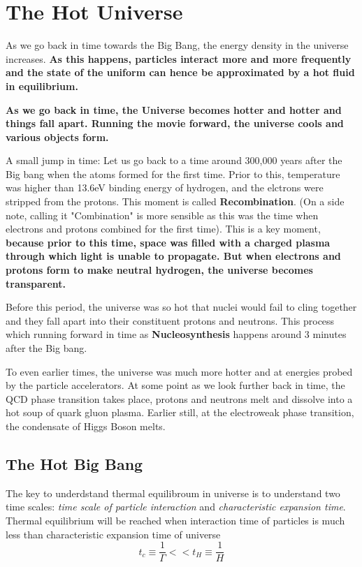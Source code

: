 \documentclass[12pt]{report}
\newcommand{\tbf}[1]{\textbf{#1}}
\newcommand{\tit}[1]{\textit{#1}}
\begin{document}
\chapter{The Hot Universe}
As we go back in time towards the Big Bang, the energy density in the universe increases. \tbf{As this happens, particles interact more and more frequently and the state of the uniform can hence be approximated by a hot fluid in equilibrium.}

\tbf{As we go back in time, the Universe becomes hotter and hotter and things fall apart. Running the movie forward, the universe cools and various objects form.}

A small jump in time: Let us go back to a time around 300,000 years after the Big bang when the atoms formed for the first time. Prior to this, temperature was higher than 13.6eV binding energy of hydrogen, and the elctrons were stripped from the protons. This moment is called \tbf{Recombination}. (On a side note, calling it "Combination" is more sensible as this was the time when electrons and protons combined for the first time). This is a key moment, \tbf{because prior to this time, space was filled with a charged plasma through which light is unable to propagate. But when electrons and protons form to make neutral hydrogen, the universe becomes transparent.}


Before this period, the universe was so hot that nuclei would fail to cling together and they fall apart into their constituent protons and neutrons. This process which running forward in time as \tbf{Nucleosynthesis} happens around 3 minutes after the Big bang.

To even earlier times, the universe was much more hotter and at energies probed by the particle accelerators. At some point as we look further back in time, the QCD phase transition takes place, protons and neutrons melt and dissolve into a hot soup of quark gluon plasma. Earlier still, at the electroweak phase transition, the condensate of Higgs Boson melts. 

\section{The Hot Big Bang}
The key to underdstand thermal equilibroum in universe is to understand two time scales: \tit{time scale of particle interaction} and \tit{characteristic expansion time}. Thermal equilibrium will be reached when interaction time of particles is much less than characteristic expansion time of universe
\begin{equation*}
t_c \equiv \frac{1}{\Gamma} << t_H \equiv \frac{1}{H}
\end{equation*}
\end{document}
